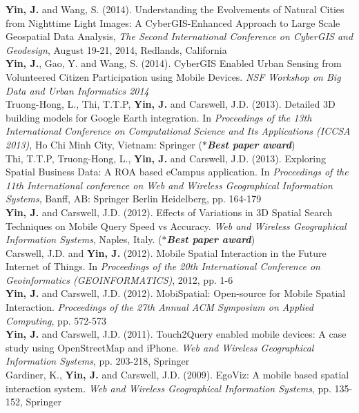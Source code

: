 \documentclass[11pt, a4paper]{article}
\newcommand{\years}[1]{\marginnote{\scriptsize #1}}
\begin{document}
\years{2014}\textbf{Yin, J.} and Wang, S. (2014). Understanding the Evolvements of Natural Cities from Nighttime Light Images: A CyberGIS-Enhanced Approach to Large Scale Geospatial Data Analysis, \textit{The Second International Conference on CyberGIS and Geodesign}, August 19-21, 2014, Redlands, California\\
\years{2014}\textbf{Yin, J.}, Gao, Y. and Wang, S. (2014). CyberGIS Enabled Urban Sensing from Volunteered Citizen Participation using Mobile Devices. \textit{NSF Workshop on Big Data and Urban Informatics 2014}\\
\years{2013}Truong-Hong, L., Thi, T.T.P, \textbf{Yin, J.} and Carswell, J.D. (2013). Detailed 3D building models for Google Earth integration. In \textit{Proceedings of the 13th International Conference on Computational Science and Its Applications (ICCSA 2013)}, Ho Chi Minh City, Vietnam: Springer (\textbf{\emph{$*$Best paper award}})\\
\years{2013}Thi, T.T.P, Truong-Hong, L., \textbf{Yin, J.} and Carswell, J.D. (2013). Exploring Spatial Business Data: A ROA based eCampus application. In \textit{Proceedings of the 11th International conference on Web and Wireless Geographical Information Systems}, Banff, AB: Springer Berlin Heidelberg, pp. 164-179\\
\years{2012}\textbf{Yin, J.} and Carswell, J.D. (2012). Effects of Variations in 3D Spatial Search Techniques on Mobile Query Speed vs Accuracy. \textit{Web and Wireless Geographical Information Systems}, Naples, Italy. (\textbf{\emph{$*$Best paper award}})\\
\years{2012}Carswell, J.D. and \textbf{Yin, J.} (2012). Mobile Spatial Interaction in the Future Internet of Things. In \textit{Proceedings of the 20th International Conference on Geoinformatics (GEOINFORMATICS)}, 2012, pp. 1-6\\
\years{2012}\textbf{Yin, J.} and Carswell, J.D. (2012). MobiSpatial: Open-source for Mobile Spatial Interaction. \textit{Proceedings of the 27th Annual ACM Symposium on Applied Computing}, pp. 572-573\\
\years{2012}\textbf{Yin, J.} and Carswell, J.D. (2011). Touch2Query enabled mobile devices: A case study using OpenStreetMap and iPhone. \textit{Web and Wireless Geographical Information Systems}, pp. 203-218, Springer\\
\years{2009} Gardiner, K., \textbf{Yin, J.} and Carswell, J.D. (2009). EgoViz: A mobile based spatial interaction system. \textit{Web and Wireless Geographical Information Systems}, pp. 135-152, Springer
\end{document}
